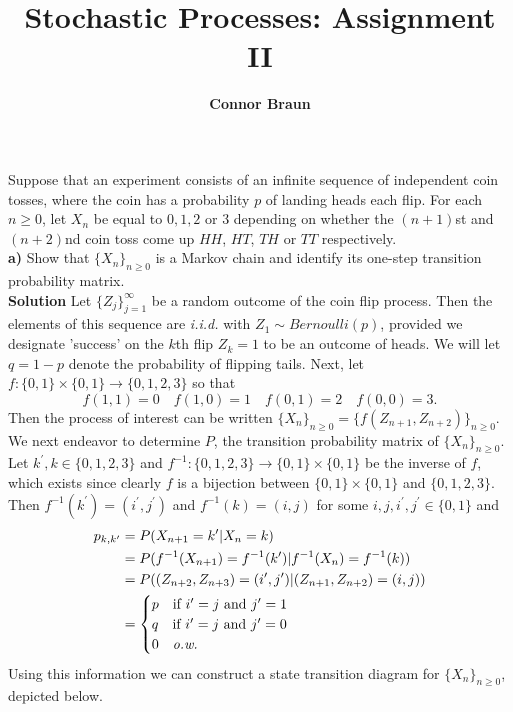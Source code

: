 \documentclass[11pt, letterpaper]{article}
\title{\bf Stochastic Processes: Assignment II}
\author{\bf Connor Braun}
\date{}
\begin{document}
    \maketitle
     Suppose that an experiment consists of an infinite sequence of independent coin tosses, where the coin has
    a probability $p$ of landing heads each flip. For each $n\geq 0$, let $X_n$ be equal to $0,1,2$ or $3$ depending on whether the $(n+1)$st and $(n+2)$nd coin toss
    come up $HH$, $HT$, $TH$ or $TT$ respectively.\\[10pt]
    {\bf a)} Show that $\{X_n\}_{n\geq 0}$ is a Markov chain and identify its one-step transition probability matrix.\\[10pt]
    {\bf Solution} Let $\{Z_j\}_{j=1}^\infty$ be a random outcome of the coin flip process. Then the elements of this sequence are {\it i.i.d.} with $Z_1\sim Bernoulli(p)$, provided
    we designate  'success' on the $k$th flip $Z_k=1$ to be an outcome of heads. We will let $q=1-p$ denote the probability of flipping tails. Next, let $f:\{0,1\}\times\{0,1\}\rightarrow\{0,1,2,3\}$ so that
    \[f(1,1)=0\quad f(1,0)=1\quad f(0,1)=2\quad f(0,0)=3.\]
    Then the process of interest can be written $\{X_n\}_{n\geq 0}=\{f(Z_{n+1},Z_{n+2})\}_{n\geq 0}$.\\[10pt] 
    We next endeavor to determine $P$, the transition probability matrix of $\{X_n\}_{n\geq 0}$. Let $k^\prime,k\in\{0,1,2,3\}$ and $f^{-1}:\{0,1,2,3\}\rightarrow\{0,1\}\times\{0,1\}$ be the inverse of $f$,
    which exists since clearly $f$ is a bijection between $\{0,1\}\times\{0,1\}$ and $\{0,1,2,3\}$. Then $f^{-1}(k^\prime)=(i^\prime,j^\prime)$ and $f^{-1}(k)=(i,j)$ for some $i,j,i^\prime,j^\prime\in\{0,1\}$ and
    \begin{align*}
        p_{k,k^\prime}&=P(X_{n+1}=k^\prime|X_n=k)\\
        &=P(f^{-1}(X_{n+1})=f^{-1}(k^\prime)|f^{-1}(X_n)=f^{-1}(k))\\
        &=P((Z_{n+2},Z_{n+3})=(i^\prime,j^\prime)|(Z_{n+1},Z_{n+2})=(i,j))\\
        &=\begin{cases}
            p\quad\text{if $i^\prime=j$ and $j^\prime=1$}\\
            q\quad\text{if $i^\prime=j$ and $j^\prime=0$}\\
            0\quad\text{{\it o.w.}}
        \end{cases}
    \end{align*}
    Using this information we can construct a state transition diagram for $\{X_n\}_{n\geq 0}$, depicted below.
\end{document}
